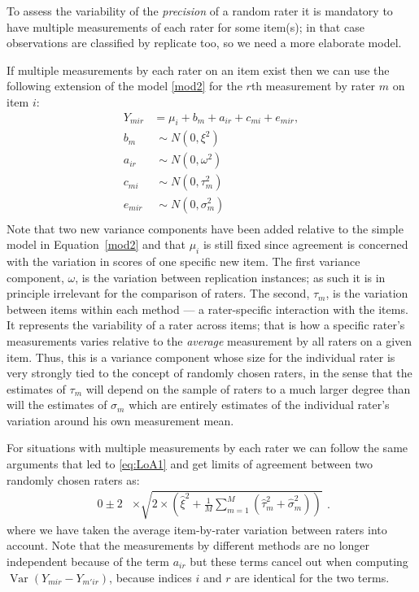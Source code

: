 \documentclass[aoas]{imsart}
\newcommand{\V}{\operatorname{Var}}
\newcommand{\median}{\operatorname{median}}
\begin{document}
To assess the variability of the \emph{precision} of a random rater
it is mandatory to have multiple measurements of each rater for some
item(s); in that case observations are classified by replicate too, so
we need a more elaborate model.

If multiple measurements by each rater on an item exist then we can
use the following extension of the model \eqref{mod2} for the $r$th
measurement by rater $m$ on item $i$:
\begin{equation}
\begin{split}
Y_{mir} &= \mu_i + b_m + a_{ir} + c_{mi} + e_{mir}, \\
b_m &~ \sim N(0, \xi^2) \\
a_{ir} &~ \sim N(0, \omega^2) \\
c_{mi} &~ \sim N(0, \tau_m^2) \\
e_{mir} &~ \sim N(0, \sigma_m^2)\\ \label{mod-linked}
\end{split}
\end{equation}
Note that two new variance components have been added relative to the
simple model in Equation~\ref{mod2} and that $\mu_i$ is still fixed
since agreement is concerned with the variation in scores of one
specific new item. The first variance component, $\omega$, is the
variation between replication instances; as such it is in principle
irrelevant for the comparison of raters.  The second, $\tau_m$, is the
variation between items within each method --- a rater-specific
interaction with the items. It represents the variability of a rater
across items; that is how a specific rater's measurements varies
relative to the \emph{average} measurement by all raters on a given
item. Thus, this is a variance component whose size for the individual
rater is very strongly tied to the concept of randomly chosen raters,
in the sense that the estimates of $\tau_m$ will depend on the sample
of raters to a much larger degree than will the estimates of
$\sigma_m$ which are entirely estimates of the individual rater's
variation around his own measurement mean.

For situations with multiple measurements by each rater we can follow
the same arguments that led to \eqref{eq:LoA1} and get limits of
agreement between two randomly chosen raters as:
\begin{equation}
  \begin{split}
   0 \pm 2 & \times \sqrt{2\times\left( \hat{\xi}^2 +
      \frac 1M \sum_{m=1}^M (\hat{\tau}_m^2 + \hat{\sigma}_m^2)
                     \right)}
  \end{split}.
  \label{eq:LoA-linked}
\end{equation}
where we have taken the average item-by-rater variation between raters
into account. Note that the measurements by different methods are no longer
independent because of the term $a_{ir}$ but these terms
cancel out when computing $\V(Y_{mir}-Y_{m'ir})$, because indices $i$ and
$r$ are identical for the two terms.
\end{document}
